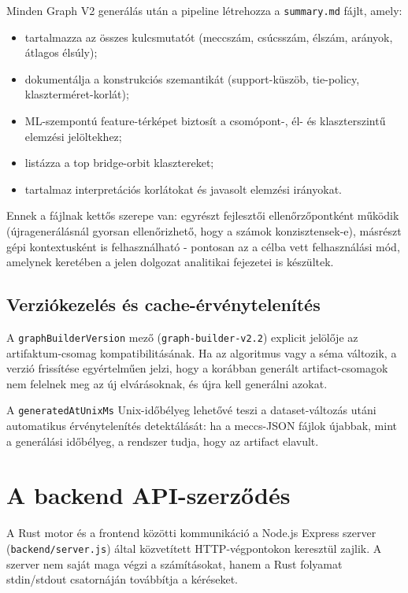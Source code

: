 Minden Graph V2 generálás után a pipeline létrehozza a \texttt{summary.md} fájlt, amely:

\begin{itemize}
    \item tartalmazza az összes kulcsmutatót (meccszám, csúcsszám, élszám, arányok, átlagos élsúly);
    \item dokumentálja a konstrukciós szemantikát (support-küszöb, tie-policy, klaszterméret-korlát);
    \item ML-szempontú feature-térképet biztosít a csomópont-, él- és klaszterszintű elemzési jelöltekhez;
    \item listázza a top bridge-orbit klasztereket;
    \item tartalmaz interpretációs korlátokat és javasolt elemzési irányokat.
\end{itemize}

Ennek a fájlnak kettős szerepe van: egyrészt fejlesztői ellenőrzőpontként működik (újragenerálásnál gyorsan ellenőrizhető, hogy a számok konzisztensek-e), másrészt gépi kontextusként is felhasználható - pontosan az a célba vett felhasználási mód, amelynek keretében a jelen dolgozat analitikai fejezetei is készültek.

\subsection{Verziókezelés és cache-érvénytelenítés}

A \texttt{graphBuilderVersion} mező (\texttt{graph-builder-v2.2}) explicit jelölője az artifaktum-csomag kompatibilitásának. Ha az algoritmus vagy a séma változik, a verzió frissítése egyértelműen jelzi, hogy a korábban generált artifact-csomagok nem felelnek meg az új elvárásoknak, és újra kell generálni azokat.

A \texttt{generatedAtUnixMs} Unix-időbélyeg lehetővé teszi a dataset-változás utáni automatikus érvénytelenítés detektálását: ha a meccs-JSON fájlok újabbak, mint a generálási időbélyeg, a rendszer tudja, hogy az artifact elavult.

\section{A backend API-szerződés}

A Rust motor és a frontend közötti kommunikáció a Node.js Express szerver (\texttt{backend/server.js}) által közvetített HTTP-végpontokon keresztül zajlik. A szerver nem saját maga végzi a számításokat, hanem a Rust folyamat stdin/stdout csatornáján továbbítja a kéréseket.

